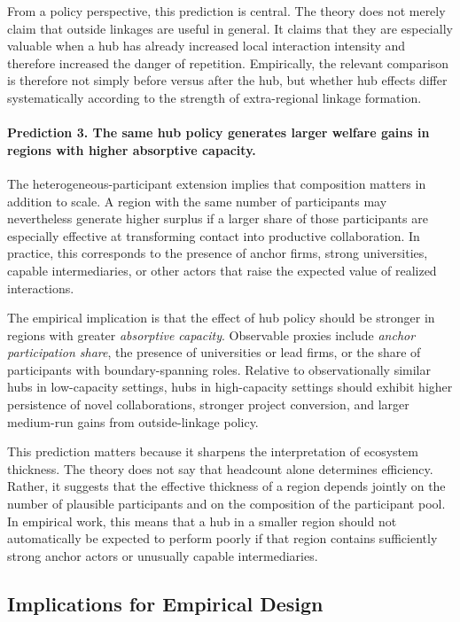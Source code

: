 From a policy perspective, this prediction is central. The theory does not merely claim that outside linkages are useful in general. It claims that they are especially valuable when a hub has already increased local interaction intensity and therefore increased the danger of repetition. Empirically, the relevant comparison is therefore not simply before versus after the hub, but whether hub effects differ systematically according to the strength of extra-regional linkage formation.

\paragraph{Prediction 3. The same hub policy generates larger welfare gains in regions with higher absorptive capacity.}

The heterogeneous-participant extension implies that composition matters in addition to scale. A region with the same number of participants may nevertheless generate higher surplus if a larger share of those participants are especially effective at transforming contact into productive collaboration. In practice, this corresponds to the presence of anchor firms, strong universities, capable intermediaries, or other actors that raise the expected value of realized interactions.

The empirical implication is that the effect of hub policy should be stronger in regions with greater \emph{absorptive capacity}. Observable proxies include \emph{anchor participation share}, the presence of universities or lead firms, or the share of participants with boundary-spanning roles. Relative to observationally similar hubs in low-capacity settings, hubs in high-capacity settings should exhibit higher persistence of novel collaborations, stronger project conversion, and larger medium-run gains from outside-linkage policy.

This prediction matters because it sharpens the interpretation of ecosystem thickness. The theory does not say that headcount alone determines efficiency. Rather, it suggests that the effective thickness of a region depends jointly on the number of plausible participants and on the composition of the participant pool. In empirical work, this means that a hub in a smaller region should not automatically be expected to perform poorly if that region contains sufficiently strong anchor actors or unusually capable intermediaries.

\subsection{Implications for Empirical Design}

